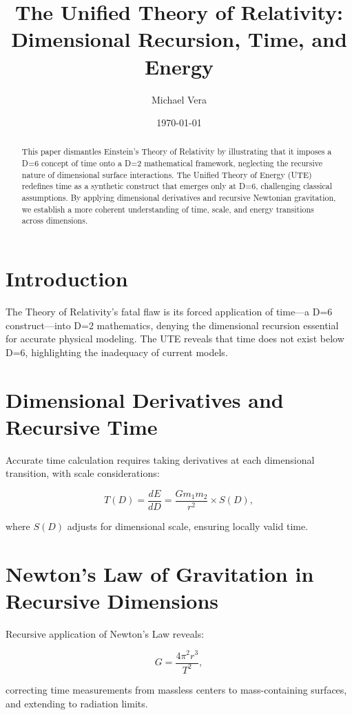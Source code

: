 \documentclass[letterpaper,12pt]{article}
\title{The Unified Theory of Relativity: Dimensional Recursion, Time, and Energy}
\author{Michael Vera}
\date{\today}
\begin{document}
\maketitle

\begin{abstract}
This paper dismantles Einstein’s Theory of Relativity by illustrating that it imposes a D=6 concept of time onto a D=2 mathematical framework, neglecting the recursive nature of dimensional surface interactions. The Unified Theory of Energy (UTE) redefines time as a synthetic construct that emerges only at D=6, challenging classical assumptions. By applying dimensional derivatives and recursive Newtonian gravitation, we establish a more coherent understanding of time, scale, and energy transitions across dimensions.
\end{abstract}

\section{Introduction}
The Theory of Relativity’s fatal flaw is its forced application of time—a D=6 construct—into D=2 mathematics, denying the dimensional recursion essential for accurate physical modeling. The UTE reveals that time does not exist below D=6, highlighting the inadequacy of current models.

\section{Dimensional Derivatives and Recursive Time}
Accurate time calculation requires taking derivatives at each dimensional transition, with scale considerations:

\begin{equation}
    T(D) = \frac{dE}{dD} = \frac{Gm_1m_2}{r^2} \times S(D),
\end{equation}

where $S(D)$ adjusts for dimensional scale, ensuring locally valid time.

\section{Newton’s Law of Gravitation in Recursive Dimensions}
Recursive application of Newton’s Law reveals:

\begin{equation}
    G = \frac{4\pi^2r^3}{T^2},
\end{equation}

correcting time measurements from massless centers to mass-containing surfaces, and extending to radiation limits.
\end{document}
